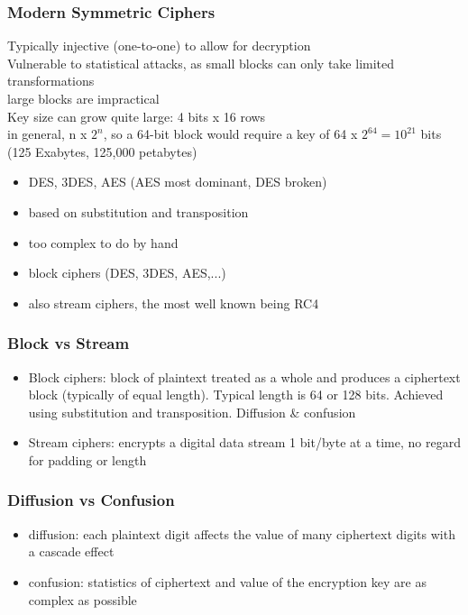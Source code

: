 \documentclass{article}
\begin{document}
\subsubsection{Modern Symmetric Ciphers}
Typically injective (one-to-one) to allow for decryption
\\Vulnerable to statistical attacks, as small blocks can only take limited transformations
\\large blocks are impractical
\\Key size can grow quite large: 4 bits x 16 rows
\\in general, n x $2^n$, so a 64-bit block would require a key of 64 x $2^64 = 10^21$ bits (125 Exabytes, 125,000 petabytes)
\begin{itemize}
    \item DES, 3DES, AES (AES most dominant, DES broken)
    \item based on substitution and transposition
    \item too complex to do by hand
    \item block ciphers (DES, 3DES, AES,...)
    \item also stream ciphers, the most well known being RC4
\end{itemize}
\subsubsection{Block vs Stream}
\begin{itemize}
    \item Block ciphers: block of plaintext treated as a whole and produces a ciphertext block (typically of equal length). Typical length is 64 or 128 bits. Achieved using substitution and transposition. Diffusion \& confusion
    \item Stream ciphers: encrypts a digital data stream 1 bit/byte at a time, no regard for padding or length
\end{itemize}
\subsubsection{Diffusion vs Confusion}
\begin{itemize}
    \item diffusion: each plaintext digit affects the value of many ciphertext digits with a cascade effect
    \item confusion: statistics of ciphertext and value of the encryption key are as complex as possible
\end{itemize}
\end{document}
